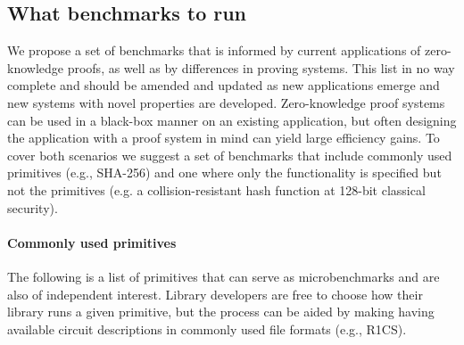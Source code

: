 \subsection{What benchmarks to run}
\label{implem:benchmarks:what-to-run}

We propose a set of benchmarks that is informed by current applications of zero-knowledge proofs, as well as by differences in proving systems.
This list in no way complete and should be amended and updated as new applications emerge and new systems with novel properties are developed.
Zero-knowledge proof systems can be used in a black-box manner on an existing application, but often designing the application with a proof system in mind can yield large efficiency gains.
To cover both scenarios we suggest a set of benchmarks that include commonly used primitives (e.g., SHA-256) and one where only the functionality is specified but not the primitives (e.g. a collision-resistant hash function at 128-bit classical security). 



\paragraph{Commonly used primitives}

The following is a list of primitives that can serve as microbenchmarks and are also of independent interest.
Library developers are free to choose how their library runs a given primitive, but the process can be aided by making having available circuit descriptions in commonly used file formats (e.g., R1CS). 


